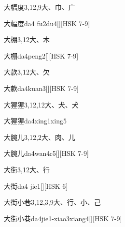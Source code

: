 \begin{Entry}{大幅度}{3,12,9}{⼤、⼱、⼴}
  \begin{Phonetics}{大幅度}{da4 fu2du4}[][HSK 7-9]
  \end{Phonetics}
\end{Entry}

\begin{Entry}{大棚}{3,12}{⼤、⽊}
  \begin{Phonetics}{大棚}{da4peng2}[][HSK 7-9]
  \end{Phonetics}
\end{Entry}

\begin{Entry}{大款}{3,12}{⼤、⽋}
  \begin{Phonetics}{大款}{da4kuan3}[][HSK 7-9]
  \end{Phonetics}
\end{Entry}

\begin{Entry}{大猩猩}{3,12,12}{⼤、⽝、⽝}
  \begin{Phonetics}{大猩猩}{da4xing1xing5}
  \end{Phonetics}
\end{Entry}

\begin{Entry}{大腕儿}{3,12,2}{⼤、⾁、⼉}
  \begin{Phonetics}{大腕儿}{da4wan4r5}[][HSK 7-9]
  \end{Phonetics}
\end{Entry}

\begin{Entry}{大街}{3,12}{⼤、⾏}
  \begin{Phonetics}{大街}{da4 jie1}[][HSK 6]
  \end{Phonetics}
\end{Entry}

\begin{Entry}{大街小巷}{3,12,3,9}{⼤、⾏、⼩、⼰}
  \begin{Phonetics}{大街小巷}{da4jie1-xiao3xiang4}[][HSK 7-9]
  \end{Phonetics}
\end{Entry}

